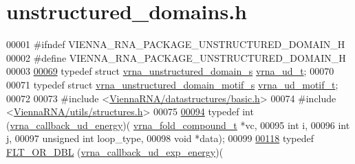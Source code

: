 \hypertarget{unstructured__domains_8h_source}{}\section{unstructured\+\_\+domains.\+h}
\label{unstructured__domains_8h_source}

\begin{DoxyCode}
00001 \textcolor{preprocessor}{#ifndef VIENNA\_RNA\_PACKAGE\_UNSTRUCTURED\_DOMAIN\_H}
00002 \textcolor{preprocessor}{#define VIENNA\_RNA\_PACKAGE\_UNSTRUCTURED\_DOMAIN\_H}
00003 
\hyperlink{group__domains__up_ga0009117b14d29143e8b18ab891f48c2d}{00069} \textcolor{keyword}{typedef} \textcolor{keyword}{struct }\hyperlink{group__domains__up_structvrna__unstructured__domain__s}{vrna\_unstructured\_domain\_s} \hyperlink{group__domains__up_structvrna__unstructured__domain__s}{vrna\_ud\_t};
00070 
00071 \textcolor{keyword}{typedef} \textcolor{keyword}{struct }\hyperlink{structvrna__unstructured__domain__motif__s}{vrna\_unstructured\_domain\_motif\_s} 
      \hyperlink{structvrna__unstructured__domain__motif__s}{vrna\_ud\_motif\_t};
00072 
00073 \textcolor{preprocessor}{#include <\hyperlink{datastructures_2basic_8h}{ViennaRNA/datastructures/basic.h}>}
00074 \textcolor{preprocessor}{#include <\hyperlink{utils_2structures_8h}{ViennaRNA/utils/structures.h}>}
00075 
\hyperlink{group__domains__up_ga75825c57d0bfde4ae4f95c044260c5c3}{00094} \textcolor{keyword}{typedef} int (\hyperlink{group__domains__up_ga75825c57d0bfde4ae4f95c044260c5c3}{vrna\_callback\_ud\_energy})(
      \hyperlink{group__fold__compound_structvrna__fc__s}{vrna\_fold\_compound\_t}  *vc,
00095                                       \textcolor{keywordtype}{int}                   i,
00096                                       \textcolor{keywordtype}{int}                   j,
00097                                       \textcolor{keywordtype}{unsigned} \textcolor{keywordtype}{int}          loop\_type,
00098                                       \textcolor{keywordtype}{void}                  *data);
00099 
\hyperlink{group__domains__up_ga861706f257ba993753464b823e65b86e}{00118} \textcolor{keyword}{typedef} \hyperlink{group__data__structures_ga31125aeace516926bf7f251f759b6126}{FLT\_OR\_DBL} (\hyperlink{group__domains__up_ga861706f257ba993753464b823e65b86e}{vrna\_callback\_ud\_exp\_energy})(

\end{DoxyCode}
